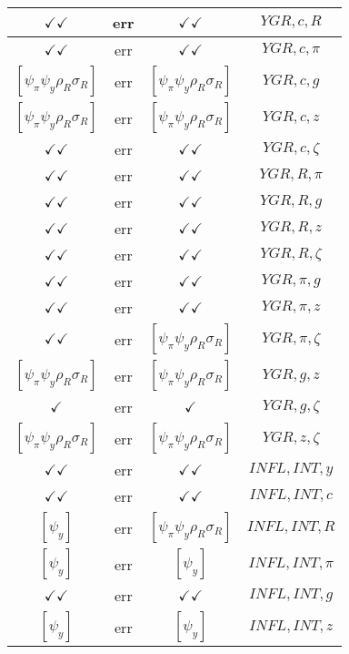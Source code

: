 \documentclass[a4paper,10pt]{article}
\begin{document}
\begin{longtable}{|c|c|c|c|}
\hline
$\checkmark\checkmark$ & err & $\checkmark\checkmark$ & ${YGR},{c},{R}$ \\
\hline
$\checkmark\checkmark$ & err & $\checkmark\checkmark$ & ${YGR},{c},{\pi}$ \\
\hline
$[\psi_\pi \psi_y \rho_R \sigma_R ]$ & err & $[\psi_\pi \psi_y \rho_R \sigma_R ]$ & ${YGR},{c},{g}$ \\
\hline
$[\psi_\pi \psi_y \rho_R \sigma_R ]$ & err & $[\psi_\pi \psi_y \rho_R \sigma_R ]$ & ${YGR},{c},{z}$ \\
\hline
$\checkmark\checkmark$ & err & $\checkmark\checkmark$ & ${YGR},{c},{\zeta}$ \\
\hline
$\checkmark\checkmark$ & err & $\checkmark\checkmark$ & ${YGR},{R},{\pi}$ \\
\hline
$\checkmark\checkmark$ & err & $\checkmark\checkmark$ & ${YGR},{R},{g}$ \\
\hline
$\checkmark\checkmark$ & err & $\checkmark\checkmark$ & ${YGR},{R},{z}$ \\
\hline
$\checkmark\checkmark$ & err & $\checkmark\checkmark$ & ${YGR},{R},{\zeta}$ \\
\hline
$\checkmark\checkmark$ & err & $\checkmark\checkmark$ & ${YGR},{\pi},{g}$ \\
\hline
$\checkmark\checkmark$ & err & $\checkmark\checkmark$ & ${YGR},{\pi},{z}$ \\
\hline
$\checkmark\checkmark$ & err & $[\psi_\pi \psi_y \rho_R \sigma_R ]$ & ${YGR},{\pi},{\zeta}$ \\
\hline
$[\psi_\pi \psi_y \rho_R \sigma_R ]$ & err & $[\psi_\pi \psi_y \rho_R \sigma_R ]$ & ${YGR},{g},{z}$ \\
\hline
$\checkmark$ & err & $\checkmark$ & ${YGR},{g},{\zeta}$ \\
\hline
$[\psi_\pi \psi_y \rho_R \sigma_R ]$ & err & $[\psi_\pi \psi_y \rho_R \sigma_R ]$ & ${YGR},{z},{\zeta}$ \\
\hline
$\checkmark\checkmark$ & err & $\checkmark\checkmark$ & ${INFL},{INT},{y}$ \\
\hline
$\checkmark\checkmark$ & err & $\checkmark\checkmark$ & ${INFL},{INT},{c}$ \\
\hline
$[\psi_y ]$ & err & $[\psi_\pi \psi_y \rho_R \sigma_R ]$ & ${INFL},{INT},{R}$ \\
\hline
$[\psi_y ]$ & err & $[\psi_y ]$ & ${INFL},{INT},{\pi}$ \\
\hline
$\checkmark\checkmark$ & err & $\checkmark\checkmark$ & ${INFL},{INT},{g}$ \\
\hline
$[\psi_y ]$ & err & $[\psi_y ]$ & ${INFL},{INT},{z}$ \\

\end{longtable}
\end{document}
